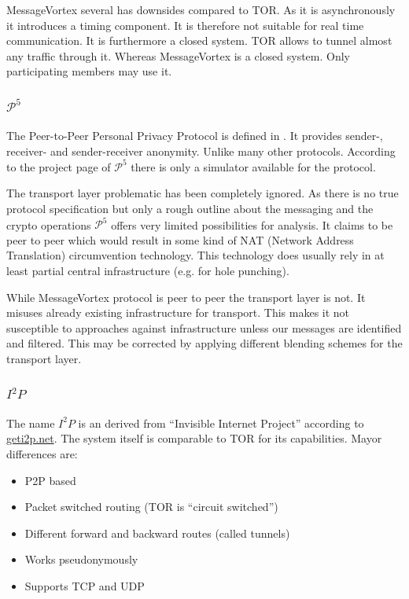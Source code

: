 \documentclass[9pt,journal,compsoc]{IEEEtran}
\begin{document}
MessageVortex several has downsides compared to TOR. As it is asynchronously it introduces a timing component. It is therefore not suitable for real time communication. It is furthermore a closed system. TOR allows to tunnel almost any traffic through it. Whereas MessageVortex is a closed system. Only participating members may use it. 

\subsubsection{$\mathcal{P}^5$}
The Peer-to-Peer Personal Privacy Protocol is defined in \cite{sherwood-protocol}. It provides sender-, receiver- and sender-receiver anonymity. Unlike many other protocols. According to the project page of $\mathcal{P}^5$ there is only a simulator available for the protocol.

The transport layer problematic has been completely ignored. As there is no true protocol specification but only a rough outline about the messaging and the crypto operations $\mathcal{P}^5$ offers very limited possibilities for analysis. It claims to be peer to peer which would result in some kind of NAT (Network Address Translation) circumvention technology. This technology does usually rely in at least partial central infrastructure (e.g. for hole punching). 

While MessageVortex protocol is peer to peer the transport layer is not. It misuses already existing infrastructure for transport. This makes it not susceptible to approaches against infrastructure unless our messages are identified and filtered. This may be corrected by applying different blending schemes for the transport layer. 

\subsubsection{$I^2P$}
The name $I^2P$ is an derived from  ``Invisible Internet Project'' according to \href{https://geti2p.net/}{geti2p.net}. The system itself is comparable to TOR for its capabilities. Mayor differences are:
\begin{itemize}
	\item P2P based
	\item Packet switched routing (TOR is ``circuit switched'')
	\item Different forward and backward routes (called tunnels)
	\item Works pseudonymously
	\item Supports TCP and UDP
\end{itemize}
\end{document}
